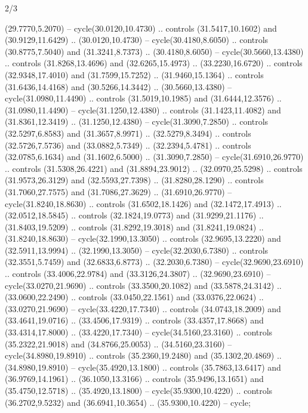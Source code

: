 \begin{flagdescription}{2/3}
\begin{scope}[yshift=\flagwidth,scale=\flagwidth/1241.93737]
\begin{scope}[y=-1mm, x=1mm,draw=gold,fill=blue,line join=miter,miter limit=4,line width=1.8\lw]
\begin{scope}[y=1mm, x=1mm, yscale=-1,shift={(573.68mm+\str,145.75)}]
\begin{scope}[scale=1.35,shift={(-9,-3)}]
\begin{scope}[scale=0.55]
\begin{scope}[scale=1.333]
    (29.7770,5.2070) -- cycle(30.0120,10.4730) .. controls (31.5417,10.1602) and
    (30.9129,11.6429) .. (30.0120,10.4730) -- cycle(30.4180,8.6050) .. controls
    (30.8775,7.5040) and (31.3241,8.7373) .. (30.4180,8.6050) --
    cycle(30.5660,13.4380) .. controls (31.8268,13.4696) and (32.6265,15.4973) ..
    (33.2230,16.6720) .. controls (32.9348,17.4010) and (31.7599,15.7252) ..
    (31.9460,15.1364) .. controls (31.6436,14.4168) and (30.5266,14.3442) ..
    (30.5660,13.4380) -- cycle(31.0980,11.4490) .. controls (31.5019,10.1985) and
    (31.6444,12.3576) .. (31.0980,11.4490) -- cycle(31.1250,12.4380) .. controls
    (31.1423,11.4082) and (31.8361,12.3419) .. (31.1250,12.4380) --
    cycle(31.3090,7.2850) .. controls (32.5297,6.8583) and (31.3657,8.9971) ..
    (32.5279,8.3494) .. controls (32.5726,7.5736) and (33.0882,5.7349) ..
    (32.2394,5.4781) .. controls (32.0785,6.1634) and (31.1602,6.5000) ..
    (31.3090,7.2850) -- cycle(31.6910,26.9770) .. controls (31.5308,26.4221) and
    (31.8894,23.9012) .. (32.0970,25.5298) .. controls (31.9573,26.3129) and
    (32.5593,27.7398) .. (31.8280,28.1290) .. controls (31.7060,27.7575) and
    (31.7086,27.3629) .. (31.6910,26.9770) -- cycle(31.8240,18.8630) .. controls
    (31.6502,18.1426) and (32.1472,17.4913) .. (32.0512,18.5845) .. controls
    (32.1824,19.0773) and (31.9299,21.1176) .. (31.8403,19.5209) .. controls
    (31.8292,19.3018) and (31.8241,19.0824) .. (31.8240,18.8630) --
    cycle(32.1990,13.3050) .. controls (32.9695,13.2220) and (32.5911,13.9994) ..
    (32.1990,13.3050) -- cycle(32.2030,6.7380) .. controls (32.3551,5.7459) and
    (32.6833,6.8773) .. (32.2030,6.7380) -- cycle(32.9690,23.6910) .. controls
    (33.4006,22.9784) and (33.3126,24.3807) .. (32.9690,23.6910) --
    cycle(33.0270,21.9690) .. controls (33.3500,20.1082) and (33.5878,24.3142) ..
    (33.0600,22.2490) .. controls (33.0450,22.1561) and (33.0376,22.0624) ..
    (33.0270,21.9690) -- cycle(33.4220,17.7340) .. controls (34.0743,18.2009) and
    (33.4641,19.0716) .. (33.4506,17.9319) .. controls (33.4357,17.8668) and
    (33.4314,17.8000) .. (33.4220,17.7340) -- cycle(34.5160,23.3160) .. controls
    (35.2322,21.9018) and (34.8766,25.0053) .. (34.5160,23.3160) --
    cycle(34.8980,19.8910) .. controls (35.2360,19.2480) and (35.1302,20.4869) ..
    (34.8980,19.8910) -- cycle(35.4920,13.1800) .. controls (35.7863,13.6417) and
    (36.9769,14.1961) .. (36.1050,13.3166) .. controls (35.9496,13.1651) and
    (35.4750,12.5718) .. (35.4920,13.1800) -- cycle(35.9300,10.4220) .. controls
    (36.2702,9.5232) and (36.6941,10.3654) .. (35.9300,10.4220) -- cycle;

\end{scope}
\end{scope}
\end{scope}
\end{scope}
\end{scope}
\end{scope}
\end{flagdescription}
